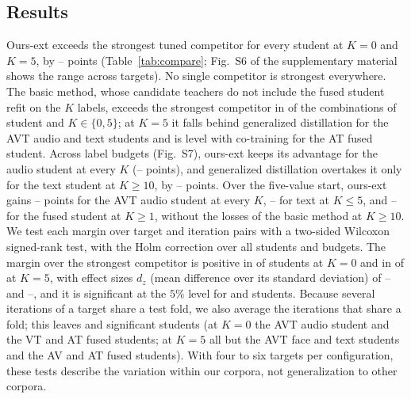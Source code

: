 \subsection{Results}
\label{sec:comparison-results}

Ours-ext exceeds the strongest tuned competitor for every student at $K=0$ and $K=5$, by -- points (Table~\ref{tab:compare}; Fig.~S6 of the supplementary material shows the range across targets).
No single competitor is strongest everywhere.
The basic method, whose candidate teachers do not include the fused student refit on the $K$ labels, exceeds the strongest competitor in  of the  combinations of student and $K \in \{0, 5\}$; at $K=5$ it falls behind generalized distillation for the AVT audio and text students and is level with co-training for the AT fused student.
Across label budgets (Fig.~S7), ours-ext keeps its advantage for the audio student at every $K$ (-- points), and generalized distillation overtakes it only for the text student at $K \ge 10$, by -- points.
Over the five-value start, ours-ext gains -- points for the AVT audio student at every $K$, -- for text at $K \le 5$, and -- for the fused student at $K \ge 1$, without the losses of the basic method at $K \ge 10$.
We test each margin over target and iteration pairs with a two-sided Wilcoxon signed-rank test, with the Holm correction over all students and budgets.
The margin over the strongest competitor is positive in  of  students at $K=0$ and in  of  at $K=5$, with effect sizes $d_z$ (mean difference over its standard deviation) of -- and --, and it is significant at the $5\%$ level for  and  students.
Because several iterations of a target share a test fold, we also average the iterations that share a fold; this leaves  and  significant students (at $K=0$ the AVT audio student and the VT and AT fused students; at $K=5$ all but the AVT face and text students and the AV and AT fused students).
With four to six targets per configuration, these tests describe the variation within our corpora, not generalization to other corpora.

